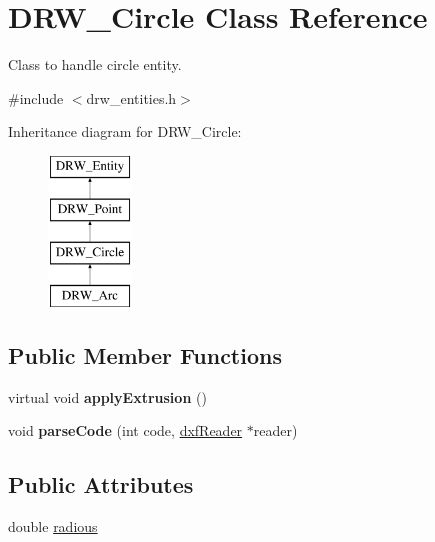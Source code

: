 \hypertarget{classDRW__Circle}{\section{D\-R\-W\-\_\-\-Circle Class Reference}
\label{classDRW__Circle}
}


Class to handle circle entity.  




{\ttfamily \#include $<$drw\-\_\-entities.\-h$>$}

Inheritance diagram for D\-R\-W\-\_\-\-Circle\-:\begin{figure}[H]
\begin{center}
\leavevmode
\includegraphics[height=4.000000cm]{classDRW__Circle}
\end{center}
\end{figure}
\subsection*{Public Member Functions}
\begin{DoxyCompactItemize}
\item 
\hypertarget{classDRW__Circle_a5c0add6ddd14a386a8c73cc4e13ce88c}{virtual void {\bfseries apply\-Extrusion} ()}\label{classDRW__Circle_a5c0add6ddd14a386a8c73cc4e13ce88c}

\item 
\hypertarget{classDRW__Circle_af460c83853091101f0305387c61da1b2}{void {\bfseries parse\-Code} (int code, \hyperlink{classdxfReader}{dxf\-Reader} $\ast$reader)}\label{classDRW__Circle_af460c83853091101f0305387c61da1b2}

\end{DoxyCompactItemize}
\subsection*{Public Attributes}
\begin{DoxyCompactItemize}
\item 
double \hyperlink{classDRW__Circle_ab431594544fbe949dd44cbb79e1a7237}{radious}
\end{DoxyCompactItemize}
